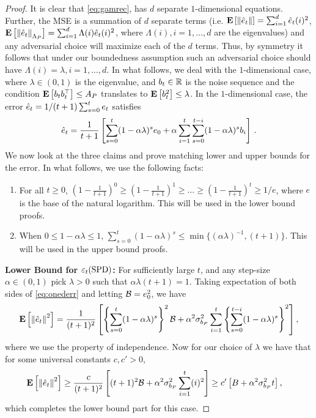 \begin{proof}
It is clear that \eqref{eq:gamrec}, has $d$ separate $1$-dimensional equations. Further, the MSE is a summation of $d$ separate terms (i.e. $\mathbf{E}\left[\left\| \hat{e}_t\right\|\right]=\sum_{i=1}^d \hat{e}_t(i)^2$, $\mathbf{E}\left[\left\| \hat{e}_t\right\|_{\Lambda_P}\right]=\sum_{i=1}^d \Lambda(i) \hat{e}_t(i)^2$, where $\Lambda(i),i=1,\ldots, d$ are the eigenvalues) and any adversarial choice will maximize each of the $d$ terms. Thus, by symmetry it follows that under our boundedness assumption such an adversarial choice should have $\Lambda(i)=\lambda, i=1,\ldots, d$. In what follows, we deal with the $1$-dimensional case, where $\lambda\in (0,1)$ is the eigenvalue, and $b_t\in \mathbb{R}$ is the noise sequence and the condition $\mathbf{E}\left[b_tb_t^\top\right]\leq A_P$ translates to $\mathbf{E}\left[b_t^2\right]\leq \lambda$. In the $1$-dimensional case, the error $\hat{e}_t = 1/(t+1) \sum_{s=0}^t e_t$ satisfies 
\begin{align}\label{eq:onederr}
\hat{e}_t=\frac{1}{t+1}\left[\sum_{s=0}^t (1-\alpha \lambda)^s e_0+ \alpha \sum_{i=1}^t \sum_{s=0}^{t-i} (1-\alpha \lambda)^s b_i\right]\,.
\end{align}
We now look at the three claims and prove matching lower and upper bounds for the error. 
In what follows, we use the following facts:
\begin{enumerate}
\item For all $t\ge 0$,
$(1-\frac{1}{t+1})^0 \ge (1-\frac{1}{t+1})^1 \ge \dots \ge (1-\frac{1}{t+1})^t \ge 1/e$,
where  $e$ is the base of the natural logarithm. This will be used in the lower bound proofs.
\item When $0\le 1-\alpha \lambda\le 1$,
 $\sum_{s=0}^t(1-\alpha \lambda)^s\leq \min\{(\alpha\lambda)^{-1},(t+1)\}$. This will be used in the upper bound proofs.
 \end{enumerate}
\textbf{Lower Bound for $\varepsilon_t(\mathrm{SPD})$:}
 For sufficiently large $t$, and any step-size$\alpha \in (0,1)$ pick $\lambda>0$ such that $\alpha \lambda (t+1)=1$. Taking expectation of both sides of \eqref{eq:onederr} and letting $\mathcal{B}=e_0^2$, we have
\begin{align}\label{eq:intererr}
\mathbf{E}\left[\left\| \hat{e}_t\right\|^2\right]
=\frac{1}{(t+1)^2}\left[ \left\{\sum_{s=0}^t(1-\alpha \lambda)^s\right\}^2 \mathcal{B}
+ \alpha^2\sigma^2_{b_P} \sum_{i=1}^t \left\{ \sum_{s=0}^{t-i} (1-\alpha \lambda)^s\right\}^2\right],
\end{align}
where we use the property of independence. Now for our choice of $\lambda$ we have
that for some universal constants $c,c'>0$,
\begin{align}
\mathbf{E}\left[\left\| \hat{e}_t\right\|^2\right]&\geq \frac{c}{(t+1)^2}\left[ (t+1)^2 \mathcal{B}+ \alpha^2\sigma^2_{b_P} \sum_{i=1}^t (i)^2\right]
\geq c' \left[B+ \alpha^2 \sigma^2_{b_P} t \right],
\end{align}
which completes the lower bound part for this case.


\end{proof}
